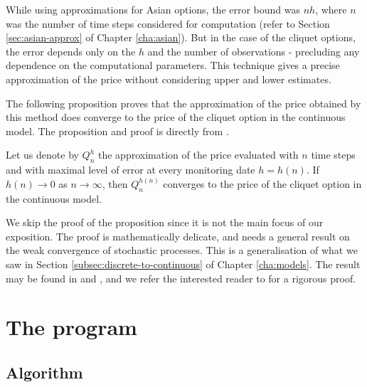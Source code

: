 \begin{rem}
	While using approximations for Asian options, the error bound was $ nh $, where $ n $ was the number of time steps considered for computation (refer to Section \ref{sec:asian-approx} of Chapter \ref{cha:asian}). But in the case of the cliquet options, the error depends only on the $ h $ and the number of observations - precluding any dependence on the computational parameters. This technique gives a precise approximation of the price without considering upper and lower estimates.
\end{rem}

The following proposition proves that the approximation of the price obtained by this method does converge to the price of the cliquet option in the continuous model. The proposition and proof is directly from .


\begin{prp}
	\label{thm:convergence-continuous}
	Let us denote by $ Q_n^h $ the approximation of the price evaluated with $ n $ time steps and with maximal level of error at every monitoring date $ h = h(n) $. If $ h(n) \to 0 $ as $ n \to \infty $, then $ Q_n^{h(n)} $ converges to the price of the cliquet option in the continuous model.
\end{prp}

We skip the proof of the proposition since it is not the main focus of our exposition. The proof is mathematically delicate, and needs a general result on the weak convergence of stochastic processes. This is a generalisation of what we saw in Section \ref{subsec:discrete-to-continuous} of Chapter \ref{cha:models}. The result may be found in \cite{kushner1984approximation} and \cite{Kushner:1992:NMS:151172}, and we refer the interested reader to \cite[Proposition 2]{Gaudenzi2011} for a rigorous proof.



\clearpage
\section{The program}
\label{sec:clq-program}

\subsection{Algorithm}

